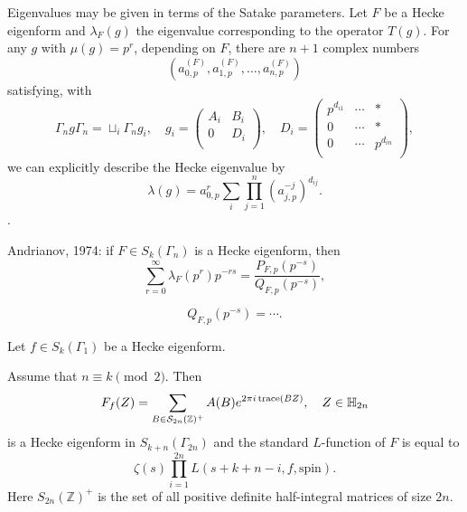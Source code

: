 \documentclass[reqno]{amsart} 
\begin{document}
Eigenvalues may be given in terms of the Satake parameters.  Let $F$ be a Hecke eigenform and $\lambda_F(g)$ the eigenvalue corresponding to the operator $T(g)$.  For any $g$ with $\mu(g) = p^r$, depending on $F$, there are $n + 1$ complex numbers
\begin{equation*}
  \left( a_{0, p}^{(F)}, a_{1, p}^{(F)}, \dotsc, a_{n, p}^{(F)} \right)
\end{equation*}
satisfying, with
\begin{equation*}
  \Gamma_n g \Gamma_n = \sqcup_i \Gamma_n g_i ,
  \quad
  g_i =
  \begin{pmatrix}
    A_i    &  B_i \\
    0           & D_i \\
  \end{pmatrix},
  \quad
  D_i =
  \begin{pmatrix}
    p^{d_{i 1}}    & \dotsb & \ast \\
    0                   & \dotsb & \ast \\
    0                   & \dotsb & p^{d_{i n}} \\
  \end{pmatrix},
\end{equation*}
we can explicitly describe the Hecke eigenvalue by
\begin{equation*}
  \lambda(g) = a_{0, p}^r \sum_i \prod_{j = 1}^n
  (a_{j, p}^{- j})^{d_{i j}}.
\end{equation*}.

Andrianov, 1974: if $F \in S_k(\Gamma_n)$ is a Hecke eigenform, then
\begin{equation*}
  \sum_{r = 0}^\infty \lambda_F(p^r) p^{- r s}
  = \frac{P_{F, p}(p^{- s})}{Q_{F, p}(p^{- s})},
\end{equation*}

\begin{equation*}
  Q_{F, p}(p^{- s}) = \dotsb.
\end{equation*}

Let $f \in S_k(\Gamma_1)$ be a Hecke eigenform.
\begin{theorem}[Ikeda, 2001]
  Assume that $n \equiv k \pmod{2}$.  Then
  \begin{equation*}
    F_f(Z) = \sum_{B \in \mathcal{S}_{2 n}(\mathbb{Z})^+}
    A(B) e^{2 \pi i \operatorname{trace}(B Z)},
    \quad
    Z \in \mathbb{H}_{2 n}
  \end{equation*}
  is a Hecke eigenform in $S_{k + n}(\Gamma_{2 n})$ and the standard $L$-function of $F$ is equal to
  \begin{equation*}
    \zeta(s) \prod_{i = 1}^{2 n}
    L(s + k + n - i, f, \mathrm{spin}).
  \end{equation*}
  Here $S_{2 n}(\mathbb{Z})^+$ is the set of all positive definite half-integral matrices of size $2 n$.
\end{theorem}
\end{document}
